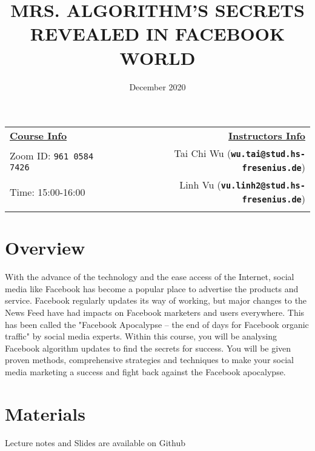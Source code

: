 \documentclass[11pt]{article}
\title{MRS. ALGORITHM'S SECRETS REVEALED IN FACEBOOK WORLD}
\date{December 2020}
\newcommand{\blankline}{\quad\pagebreak[2]}
\begin{document}
\maketitle

\begin{tabular*}{.93\textwidth}{@{\extracolsep{\fill}}lr}



\textbf{\underline {Course Info}} & \textbf{\underline {Instructors Info}} \\
Zoom ID: \texttt{961 0584 7426} & Tai Chi Wu ({\tt\bf wu.tai@stud.hs-fresenius.de}) \\

 Time: 15:00-16:00  &  Linh Vu ({\tt\bf vu.linh2@stud.hs-fresenius.de}) \\

&  \\
\hline
\end{tabular*}

\vspace{5 mm}


\section*{Overview}

With the advance of the technology and the ease access of the Internet, social media like Facebook has become a popular place to advertise the products and service. Facebook regularly updates its way of working, but  major changes to the News Feed have had impacts on Facebook marketers and users everywhere. This has been called the "Facebook Apocalypse – the end of days for Facebook organic traffic" by social media experts. Within this course, you will be analysing Facebook algorithm updates to find the secrets for success. You will be given proven methods, comprehensive strategies and techniques to make your social media marketing a success and fight back against the Facebook apocalypse.     

\section*{Materials}

Lecture notes and Slides are available on Github
\end{document}
